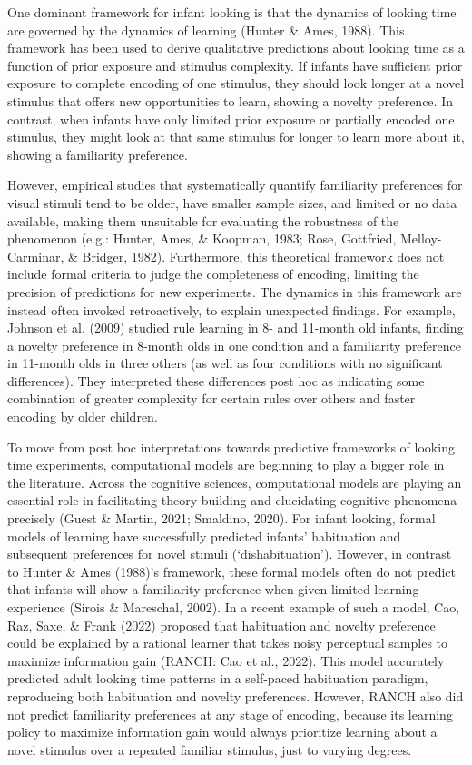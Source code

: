 \documentclass[10pt, letterpaper]{article}
\begin{document}
One dominant framework for infant looking is that the dynamics of
looking time are governed by the dynamics of learning (Hunter \& Ames,
1988). This framework has been used to derive qualitative predictions
about looking time as a function of prior exposure and stimulus
complexity. If infants have sufficient prior exposure to complete
encoding of one stimulus, they should look longer at a novel stimulus
that offers new opportunities to learn, showing a novelty preference. In
contrast, when infants have only limited prior exposure or partially
encoded one stimulus, they might look at that same stimulus for longer
to learn more about it, showing a familiarity preference.

However, empirical studies that systematically quantify familiarity
preferences for visual stimuli tend to be older, have smaller sample
sizes, and limited or no data available, making them unsuitable for
evaluating the robustness of the phenomenon (e.g.: Hunter, Ames, \&
Koopman, 1983; Rose, Gottfried, Melloy-Carminar, \& Bridger, 1982).
Furthermore, this theoretical framework does not include formal criteria
to judge the completeness of encoding, limiting the precision of
predictions for new experiments. The dynamics in this framework are
instead often invoked retroactively, to explain unexpected findings. For
example, Johnson et al. (2009) studied rule learning in 8- and 11-month
old infants, finding a novelty preference in 8-month olds in one
condition and a familiarity preference in 11-month olds in three others
(as well as four conditions with no significant differences). They
interpreted these differences post hoc as indicating some combination of
greater complexity for certain rules over others and faster encoding by
older children.

To move from post hoc interpretations towards predictive frameworks of
looking time experiments, computational models are beginning to play a
bigger role in the literature. Across the cognitive sciences,
computational models are playing an essential role in facilitating
theory-building and elucidating cognitive phenomena precisely (Guest \&
Martin, 2021; Smaldino, 2020). For infant looking, formal models of
learning have successfully predicted infants' habituation and subsequent
preferences for novel stimuli (`dishabituation'). However, in contrast
to Hunter \& Ames (1988)'s framework, these formal models often do not
predict that infants will show a familiarity preference when given
limited learning experience (Sirois \& Mareschal, 2002). In a recent
example of such a model, Cao, Raz, Saxe, \& Frank (2022) proposed that
habituation and novelty preference could be explained by a rational
learner that takes noisy perceptual samples to maximize information gain
(RANCH: Cao et al., 2022). This model accurately predicted adult looking
time patterns in a self-paced habituation paradigm, reproducing both
habituation and novelty preferences. However, RANCH also did not predict
familiarity preferences at any stage of encoding, because its learning
policy to maximize information gain would always prioritize learning
about a novel stimulus over a repeated familiar stimulus, just to
varying degrees.
\end{document}
